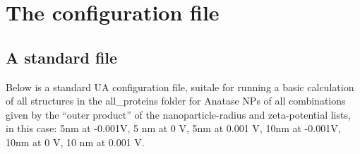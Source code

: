 \documentclass[10pt,a4paper,onecolumn]{report}
\begin{document}
 
 
\section{The configuration file}
 
\subsection{A standard file} 
 
 
Below is a standard UA configuration file, suitale for running a basic calculation of all structures in the all\_proteins folder for Anatase NPs of all combinations given by the ``outer product'' of the nanoparticle-radius and zeta-potential lists, in this case: 5nm at -0.001V, 5 nm at 0 V, 5nm at 0.001 V, 10nm at -0.001V, 10nm at 0 V, 10 nm at 0.001 V. 
\end{document}
